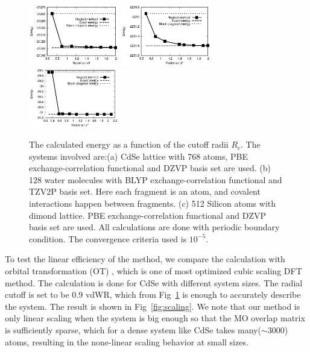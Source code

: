 \documentclass[aps,prl,twocolumn,reprint,amsmath,amssymb]{revtex4-1}
\begin{document}
\begin{figure}
\includegraphics[width=0.35\textwidth]{CdSe}
\includegraphics[width=0.35\textwidth]{H2O}
\includegraphics[width=0.35\textwidth]{Si}
\caption{The calculated energy as a function of the cutoff radii $R_c$. The systems involved are:(a) CdSe lattice with 768 atoms, PBE exchange-correlation functional and DZVP basis set are used. (b) 128 water molecules with BLYP exchange-correlation functional and TZV2P basis set. Here each fragment is an atom, and covalent interactions happen between fragments. (c) 512 Silicon atoms with dimond lattice. PBE exchange-correlation functional and DZVP basis set are used. All calculations are done with periodic boundary condition. The convergence criteria used is $10^{-5}$.}
\label{fig:accuracy}
\end{figure}

\label{marker:performance}To test the linear efficiency of the method, we compare the calculation with orbital transformation (OT) \cite{weber2008direct,vandevondele2003efficient}, which is one of most optimized cubic scaling DFT method. The calculation is done for CdSe with different system sizes. The radial cutoff is set to be 0.9 vdWR, which from Fig~\ref{fig:accuracy} is enough to accurately describe the system. The result is shown in Fig~\ref{fig:scaling}. We note that our method is only linear scaling when the system is big enough so that the MO overlap matrix is sufficiently sparse, which for a dense system like CdSe takes many($\sim 3000$) atoms, resulting in the none-linear scaling behavior at small sizes.
\end{document}
